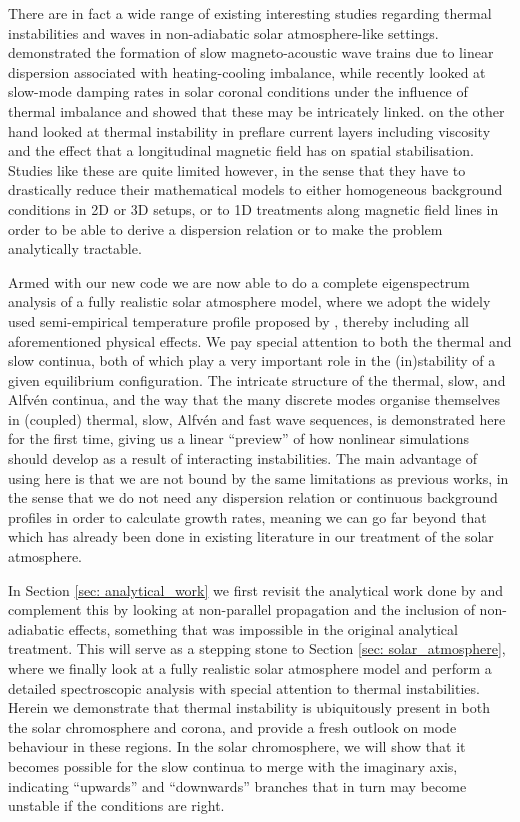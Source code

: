 There are in fact a wide range of existing interesting studies regarding thermal instabilities and waves in non-adiabatic solar atmosphere-like settings. \citet{zavershinskii2019} demonstrated the formation of slow magneto-acoustic wave trains due to linear dispersion associated with heating-cooling imbalance, while recently \citet{duckenfield2021} looked at slow-mode damping rates in solar coronal conditions under the influence of thermal imbalance and showed that these may be intricately linked. \citet{ledentsov2021} on the other hand looked at thermal instability in preflare current layers including viscosity and the effect that a longitudinal magnetic field has on spatial stabilisation. Studies like these are quite limited however, in the sense that they have to drastically reduce their mathematical models to either homogeneous background conditions in 2D or 3D setups, or to 1D treatments along magnetic field lines in order to be able to derive a dispersion relation or to make the problem analytically tractable.

Armed with our new {\legolas} code we are now able to do a complete eigenspectrum analysis of a fully realistic solar atmosphere model, where we adopt the widely used semi-empirical temperature profile proposed by \citet{avrett2008}, thereby including all aforementioned physical effects. We pay special attention to both the thermal and slow continua, both of which play a very important role in the (in)stability of a given equilibrium configuration. The intricate structure of the thermal, slow, and Alfv\'en continua, and the way that the many discrete modes organise themselves in (coupled) thermal, slow, Alfv\'en and fast wave sequences, is demonstrated here for the first time, giving us a linear ``preview'' of how nonlinear simulations should develop as a result of interacting instabilities. The main advantage of using {\legolas} here is that we are not bound by the same limitations as previous works, in the sense that we do not need any dispersion relation or continuous background profiles in order to calculate growth rates, meaning we can go far beyond that which has already been done in existing literature in our treatment of the solar atmosphere.

In Section \ref{sec: analytical_work} we first revisit the analytical work done by \citet{nye1976} and complement this by looking at non-parallel propagation and the inclusion of non-adiabatic effects, something that was impossible in the original analytical treatment. This will serve as a stepping stone to Section \ref{sec: solar_atmosphere}, where we finally look at a fully realistic solar atmosphere model and perform a detailed spectroscopic analysis with special attention to thermal instabilities. Herein we demonstrate that thermal instability is ubiquitously present in both the solar chromosphere and corona, and provide a fresh outlook on mode behaviour in these regions. In the solar chromosphere, we will show that it becomes possible for the slow continua to merge with the imaginary axis, indicating ``upwards'' and ``downwards'' branches that in turn may become unstable if the conditions are right.


